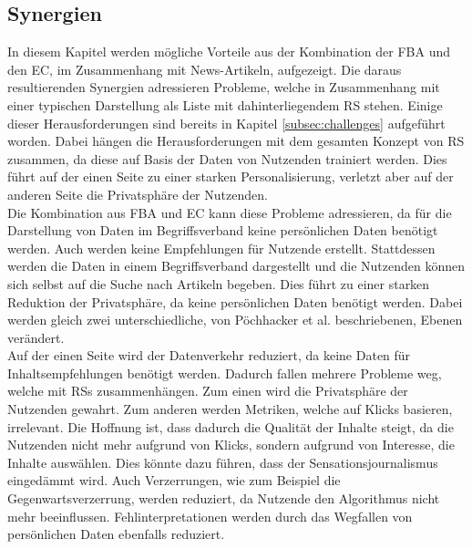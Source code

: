 \subsection{Synergien}
In diesem Kapitel werden mögliche Vorteile aus der Kombination der \ac{FBA} und den \ac{EC}, im Zusammenhang mit News-Artikeln, aufgezeigt.
Die daraus resultierenden Synergien adressieren Probleme, welche in Zusammenhang mit einer typischen Darstellung als Liste mit dahinterliegendem \ac{RS} stehen.
Einige dieser Herausforderungen sind bereits in Kapitel \ref{subsec:challenges} aufgeführt worden.
Dabei hängen die Herausforderungen mit dem gesamten Konzept von \ac{RS} zusammen, da diese auf Basis der Daten von Nutzenden trainiert werden.
Dies führt auf der einen Seite zu einer starken Personalisierung, verletzt aber auf der anderen Seite die Privatsphäre der Nutzenden.\\

Die Kombination aus \ac{FBA} und \ac{EC} kann diese Probleme adressieren, da für die Darstellung von Daten im Begriffsverband keine persönlichen Daten benötigt werden.
Auch werden keine Empfehlungen für Nutzende erstellt.
Stattdessen werden die Daten in einem Begriffsverband dargestellt und die Nutzenden können sich selbst auf die Suche nach Artikeln begeben.
Dies führt zu einer starken Reduktion der Privatsphäre, da keine persönlichen Daten benötigt werden.
Dabei werden gleich zwei unterschiedliche, von Pöchhacker et al. beschriebenen, Ebenen verändert.\\

Auf der einen Seite wird der Datenverkehr reduziert, da keine Daten für Inhaltsempfehlungen benötigt werden.
Dadurch fallen mehrere Probleme weg, welche mit \acp{RS} zusammenhängen.
Zum einen wird die Privatsphäre der Nutzenden gewahrt.
Zum anderen werden Metriken, welche auf Klicks basieren, irrelevant.
Die Hoffnung ist, dass dadurch die Qualität der Inhalte steigt, da die Nutzenden nicht mehr aufgrund von Klicks, sondern aufgrund von Interesse, die Inhalte auswählen.
Dies könnte dazu führen, dass der Sensationsjournalismus eingedämmt wird.
Auch Verzerrungen, wie zum Beispiel die Gegenwartsverzerrung, werden reduziert, da Nutzende den Algorithmus nicht mehr beeinflussen.
Fehlinterpretationen werden durch das Wegfallen von persönlichen Daten ebenfalls reduziert. \\

